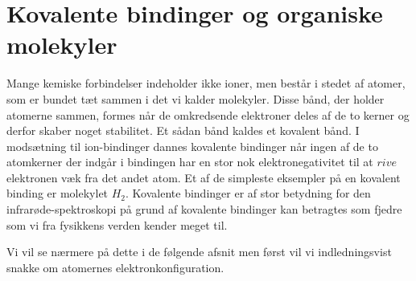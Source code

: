 \chapter{Kovalente bindinger og organiske molekyler}

Mange kemiske forbindelser indeholder ikke ioner, men består i stedet af atomer, som er bundet tæt sammen i det vi kalder molekyler. Disse bånd, der holder atomerne sammen, formes når de omkredsende elektroner deles af de to kerner og derfor skaber noget stabilitet. Et sådan bånd kaldes et kovalent bånd. I modsætning til ion-bindinger dannes kovalente bindinger når ingen af de to atomkerner der indgår i bindingen har en stor nok elektronegativitet til at $rive$ elektronen væk fra det andet atom. Et af de simpleste eksempler på en kovalent binding er molekylet $H_2$. Kovalente bindinger er af stor betydning for den infrarøde-spektroskopi på grund af kovalente bindinger kan betragtes som fjedre som vi fra fysikkens verden kender meget til.

Vi vil se nærmere på dette i de følgende afsnit men først vil vi indledningsvist snakke om atomernes elektronkonfiguration. 

